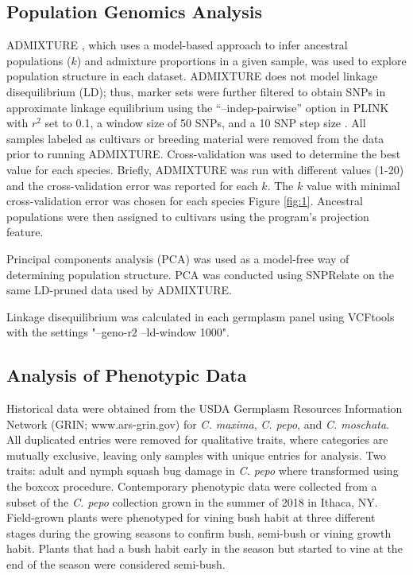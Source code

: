 \documentclass[utf8]{FrontiersinHarvard} %
\begin{document}
\subsection{Population Genomics Analysis}
ADMIXTURE \citep{Alexander2011}, which uses a model-based approach to infer ancestral populations ($k$) and admixture proportions in a given sample, was used to explore population structure in each dataset. ADMIXTURE does not model linkage disequilibrium (LD); thus, marker sets were further filtered to obtain SNPs in approximate linkage equilibrium using the “–indep-pairwise” option in PLINK \citep{Purcell2007} with $r^{2}$ set to 0.1, a window size of 50 SNPs, and a 10 SNP step size . All samples labeled as cultivars or breeding material were removed from the data prior to running ADMIXTURE. Cross-validation was used to determine the best  value for each species. Briefly, ADMIXTURE was run with different  values (1-20) and the cross-validation error was reported for each $k$. The $k$ value with minimal cross-validation error was chosen for each species Figure \ref{fig:1}. Ancestral populations were then assigned to cultivars using the program’s projection feature.

Principal components analysis (PCA) was used as a model-free way of determining population structure. PCA was conducted using SNPRelate \citep{Zheng2012} on the same LD-pruned data used by ADMIXTURE.

Linkage disequilibrium was calculated in each germplasm panel using VCFtools \citep{Danecek2011} with the settings "--geno-r2 --ld-window 1000".

\subsection{Analysis of Phenotypic Data}
Historical data were obtained from the USDA Germplasm Resources Information Network (GRIN; www.ars-grin.gov) for \textit{C. maxima}, \textit{C. pepo}, and \textit{C. moschata}. All duplicated entries were removed for qualitative traits, where categories are mutually exclusive, leaving only samples with unique entries for analysis. Two traits: adult and nymph squash bug damage in \textit{C. pepo} where transformed using the boxcox procedure. Contemporary phenotypic data were collected from a subset of the \textit{C. pepo} collection grown in the summer of 2018 in Ithaca, NY. Field-grown plants were phenotyped for vining bush habit at three different stages during the growing seasons to confirm bush, semi-bush or vining growth habit. Plants that had a bush habit early in the season but started to vine at the end of the season were considered semi-bush.
\end{document}
